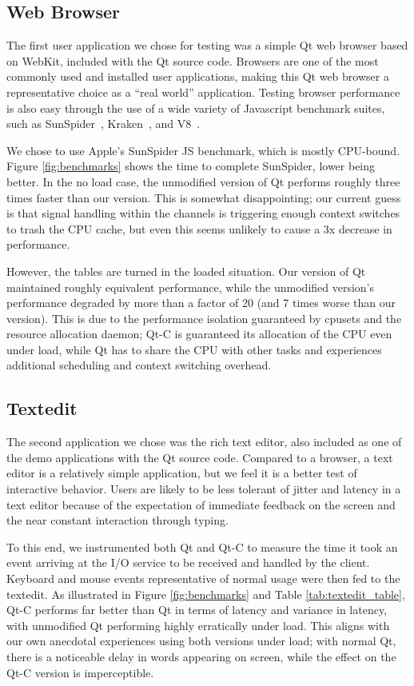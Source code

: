 \documentclass[letterpaper,twocolumn,11pt]{article}
\begin{document}
\subsection{Web Browser}

The first user application we chose for testing was a simple Qt web browser based on WebKit, included with the Qt source code. Browsers are one of the most commonly used and installed user applications, making this Qt web browser a representative choice as a ``real world'' application. Testing browser performance is also easy through the use of a wide variety of Javascript benchmark suites, such as SunSpider~\cite{sunspider}, Kraken~\cite{kraken}, and V8~\cite{v8benchmark}.

We chose to use Apple's SunSpider JS benchmark, which is mostly CPU-bound. Figure \ref{fig:benchmarks} shows the time to complete SunSpider, lower being better. In the no load case, the unmodified version of Qt performs roughly three times faster than our version. This is somewhat disappointing; our current guess is that signal handling within the channels is triggering enough context switches to trash the CPU cache, but even this seems unlikely to cause a 3x decrease in performance.

However, the tables are turned in the loaded situation. Our version of Qt maintained roughly equivalent performance, while the unmodified version's performance degraded by more than a factor of 20 (and 7 times worse than our version). This is due to the performance isolation guaranteed by cpusets and the resource allocation daemon; Qt-C is guaranteed its allocation of the CPU even under load, while Qt has to share the CPU with other tasks and experiences additional scheduling and context switching overhead.

\subsection{Textedit}

The second application we chose was the rich text editor, also included as one of the demo applications with the Qt source code. Compared to a browser, a text editor is a relatively simple application, but we feel it is a better test of interactive behavior. Users are likely to be less tolerant of jitter and latency in a text editor because of the expectation of immediate feedback on the screen and the near constant interaction through typing. 

To this end, we instrumented both Qt and Qt-C to measure the time it took an event arriving at the I/O service to be received and handled by the client. Keyboard and mouse events representative of normal usage were then fed to the textedit. As illustrated in Figure \ref{fig:benchmarks} and Table \ref{tab:textedit_table}, Qt-C performs far better than Qt in terms of latency and variance in latency, with unmodified Qt performing highly erratically under load. This aligns with our own anecdotal experiences using both versions under load; with normal Qt, there is a noticeable delay in words appearing on screen, while the effect on the Qt-C version is imperceptible.
\end{document}
